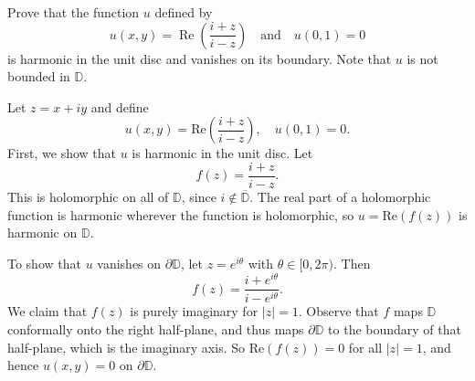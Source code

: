 \documentclass[12pt]{article}
\begin{document}
\begin{statement}[8.5.9]
    Prove that the function $u$ defined by
        $$ u(x, y) = \operatorname{Re} \left( \frac{i + z}{i - z} \right) \quad \text{and} \quad u(0, 1) = 0 $$
    is harmonic in the unit disc and vanishes on its boundary. Note that $u$ is not bounded in $\mathbb{D}$.
\end{statement}
\begin{newproof}
    Let $z = x + iy$ and define
    $$ u(x, y) = \text{Re} \left( \frac{i + z}{i - z} \right), \quad u(0,1) = 0. $$
    First, we show that $u$ is harmonic in the unit disc. Let 
    $$ f(z) = \frac{i + z}{i - z}. $$
    This is holomorphic on all of $\mathbb{D}$, since $i \notin \overline{\mathbb{D}}$. The real part of a holomorphic function is harmonic wherever the function is holomorphic, so $u = \text{Re}(f(z))$ is harmonic on $\mathbb{D}$.
    \par To show that $u$ vanishes on $\partial \mathbb{D}$, let $z = e^{i\theta}$ with $\theta \in [0, 2\pi)$. Then
    $$ f(z) = \frac{i + e^{i\theta}}{i - e^{i\theta}}. $$
    We claim that $f(z)$ is purely imaginary for $|z| = 1$. Observe that $f$ maps $\mathbb{D}$ conformally onto the right half-plane, and thus maps $\partial \mathbb{D}$ to the boundary of that half-plane, which is the imaginary axis. So $\text{Re}(f(z)) = 0$ for all $|z| = 1$, and hence $u(x,y) = 0$ on $\partial \mathbb{D}$.
\end{newproof}
\end{document}
